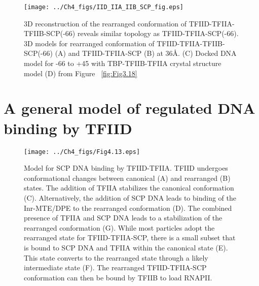 \begin{figure}
\centering
\texttt{[image: ../Ch4\_figs/IID\_IIA\_IIB\_SCP\_fig.eps]}
\caption[3D reconstruction of the rearranged conformation of TFIID-TFIIA-TFIIB-SCP(-66) reveals similar topology as TFIID-TFIIA-SCP(-66)]{3D reconstruction of the rearranged conformation of TFIID-TFIIA-TFIIB-SCP(-66) reveals similar topology as TFIID-TFIIA-SCP(-66). 3D models for rearranged conformation of TFIID-TFIIA-TFIIB-SCP(-66) (A) and TFIID-TFIIA-SCP (B) at 36\AA. (C) Docked DNA model for -66 to +45 with TBP-TFIIB-TFIIA crystal structure model (D) from Figure ~\ref{fig:Fig3.18} }
\label{fig:IIB_cryo}
\end{figure}

\section{A general model of regulated DNA binding by TFIID}
\begin{figure}
\centering
\texttt{[image: ../Ch4\_figs/Fig4.13.eps]}
\caption[Model for SCP DNA binding by TFIID-TFIIA]{Model for SCP DNA binding by TFIID-TFIIA. TFIID undergoes conformational changes between canonical (A) and rearranged (B) states. The addition of TFIIA stabilizes the canonical conformation (C). Alternatively, the addition of SCP DNA leads to binding of the Inr-MTE/DPE to the rearranged conformation (D).  The combined presence of TFIIA and SCP DNA leads to a stabilization of the rearranged conformation (G).  While most particles adopt the rearranged state for TFIID-TFIIA-SCP, there is a small subset that is bound to SCP DNA and TFIIA within the canonical state (E). This state converts to the rearranged state through a likely intermediate state (F). The rearranged TFIID-TFIIA-SCP conformation can then be bound by TFIIB to load RNAPII.}
\label{fig:Fig4.13}
\end{figure}

